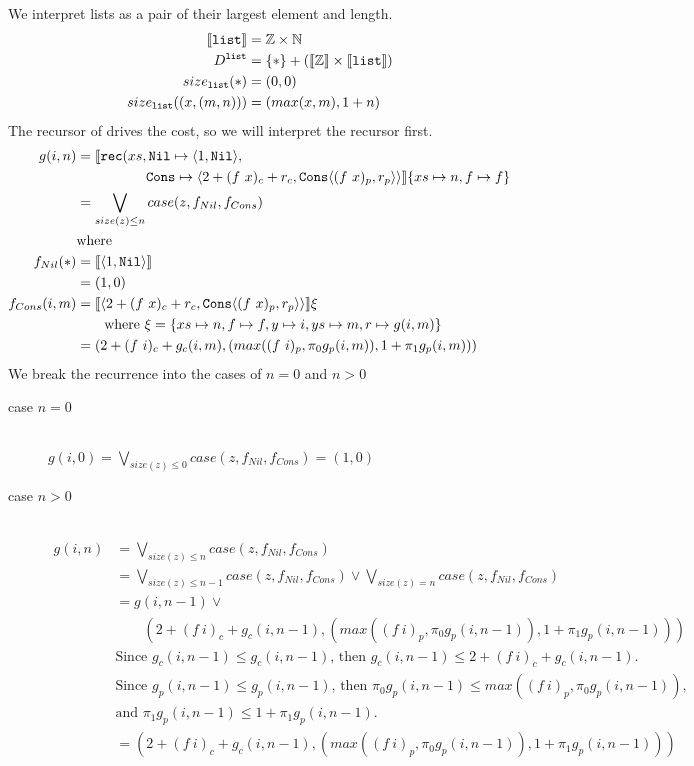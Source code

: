 We interpret lists as a pair of their largest element and length.
%
\begin{align*}
  \llbracket \texttt{list} \rrbracket &= \mathbb{Z} \times \mathbb{N} \\
  D^{\texttt{list}} &= \{*\} + (\llbracket \mathbb{Z} \rrbracket \times \llbracket \texttt{list} \rrbracket) \\
  size_{\texttt{list}}(*) &= (0, 0) \\
  size_{\texttt{list}}((x, (m, n))) &= (max(x, m), 1 + n)
\end{align*}
%
The recursor of  drives the cost, so we will interpret the recursor
first.
%
\begin{align*}
  g(i, n) &= \LB \T{rec}(xs, \T{Nil} \mapsto \LP 1,\T{Nil}\RP, \\
       &\quadfive \T{Cons} \mapsto \LP 2 + (f\ x)_c + r_c,\T{Cons}\LP (f\ x)_p,r_p\RP\RP \RB \{xs \mapsto n, f \mapsto f\}\\
       &= \bigvee\limits_{size(z) \leq n} case(z, f_{Nil}, f_{Cons}) \\
       &\text{where} \\
  f_{Nil}(\ast) &= \LB \LP 1,\T{Nil}\RP\RB \\
                &= (1,0) \\
  f_{Cons}(i, m) &= \LB \LP 2 + (f\ x)_c + r_c,\T{Cons}\LP (f\ x)_p,r_p\RP\RP\RB \xi\\
                 &\qquad \text{where } \xi = \{xs \mapsto n, f \mapsto f, y \mapsto i, ys \mapsto m, r \mapsto g(i, m) \} \\
                 &= (2 + (f\ i)_c + g_c(i,m), (max((f\ i)_p, \pi_0g_p(i,m)), 1 + \pi_1 g_p(i,m)))
\end{align*}
%
We break the recurrence into the cases of $n=0$ and $n>0$
%
\begin{description}
  \item[case $n=0$]\hfill \\
    $g(i,0) = \bigvee\limits_{size(z) \leq 0} case(z, f_{Nil}, f_{Cons}) = (1,0)$
  \item[case $n>0$]\hfill \\
    \begin{align*}
      g(i,n) &= \bigvee\limits_{size(z) \leq n} case(z, f_{Nil}, f_{Cons}) \\
             &= \bigvee\limits_{size(z) \leq n-1} case(z,f_{Nil},f_{Cons}) \vee \bigvee\limits_{size(z) = n} case(z,f_{Nil}, f_{Cons}) \\
             &= g(i,n-1) \vee \\
             &\qquad (2 + (f\ i)_c + g_c(i,n-1), (max((f\ i)_p,\pi_0g_p(i,n-1)), 1 + \pi_1 g_p(i,n-1))) \\
             &\text{Since $g_c(i,n-1) \leq g_c(i,n-1)$, then $g_c(i,n-1)\leq 2 + (f\ i)_c + g_c(i,n-1)$.} \\
             &\text{Since $g_p(i,n-1) \leq g_p(i,n-1)$, then $\pi_0 g_p(i,n-1) \leq max((f\ i)_p, \pi_0g_p(i,n-1))$,} \\
             &\text{and $\pi_1 g_p(i,n-1) \leq 1 + \pi_1 g_p(i,n-1)$.} \\
             &= (2 + (f\ i)_c + g_c(i,n-1), (max((f\ i)_p,\pi_0g_p(i,n-1)), 1 + \pi_1 g_p(i,n-1))) \\
    \end{align*}
\end{description}
